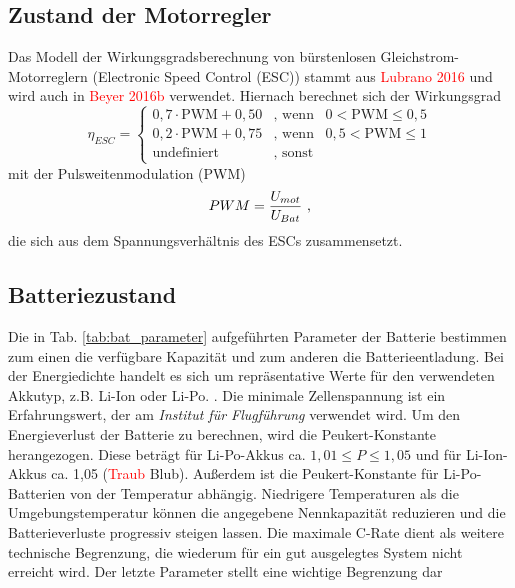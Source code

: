 \subsection{Zustand der Motorregler}
\label{subsec:motorreglerzustand}
Das Modell der Wirkungsgradsberechnung von bürstenlosen Gleichstrom-Motorreglern (Electronic Speed Control (ESC)) stammt aus \textcolor{red}{Lubrano 2016} und wird auch in \textcolor{red}{Beyer 2016b} verwendet. Hiernach berechnet sich der Wirkungsgrad 
\begin{equation}
\eta_{ESC} = \begin{cases} 
0,7\cdot \text{PWM} + 0,50 & \text{, wenn} \;\;\; 0 < \text{PWM} \leq 0,5 \\ 
0,2\cdot \text{PWM} + 0,75 & \text{, wenn} \;\;\; 0,5 < \text{PWM} \leq 1 \\ 
\text{undefiniert} & \text{, sonst} 
\end{cases}
\label{eq:eta_pwm}
\end{equation} 
mit der Pulsweitenmodulation (PWM) 
\begin{equation}
	PWM = \frac{U_{mot}}{U_{Bat}} ~\text{,}
\end{equation}
die sich aus dem Spannungsverhältnis des ESCs zusammensetzt.


\subsection{Batteriezustand}
\label{subsec:batteriezustand}

Die in Tab. \ref{tab:bat_parameter} aufgeführten Parameter der Batterie bestimmen zum einen die verfügbare Kapazität und zum anderen die Batterieentladung. Bei der Energiedichte handelt es sich um repräsentative Werte für den verwendeten Akkutyp, z.B. Li-Ion oder Li-Po. . Die minimale Zellenspannung ist ein Erfahrungswert, der am \textit{Institut für Flugführung} verwendet wird. Um den Energieverlust der Batterie zu berechnen, wird die Peukert-Konstante herangezogen. Diese beträgt für Li-Po-Akkus ca. $1,01 \leq P \leq 1,05$ und für Li-Ion-Akkus ca. 1,05 (\textcolor{red}{Traub} Blub). Außerdem ist die Peukert-Konstante für Li-Po-Batterien von der Temperatur abhängig. Niedrigere Temperaturen als die Umgebungstemperatur können die angegebene Nennkapazität reduzieren und die Batterieverluste progressiv steigen lassen. Die maximale C-Rate dient als weitere technische Begrenzung, die wiederum für ein gut ausgelegtes System nicht erreicht wird. Der letzte Parameter stellt eine wichtige Begrenzung dar 

